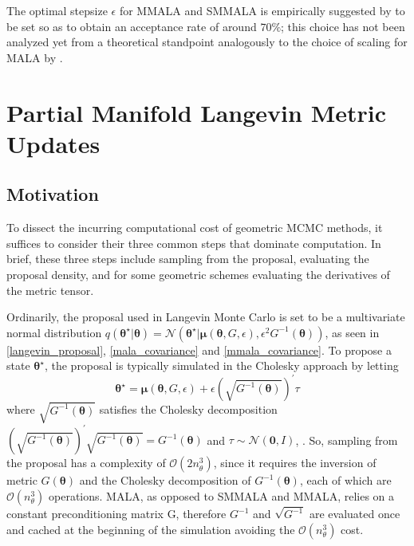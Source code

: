 \documentclass[twoside,11pt]{article}
\begin{document}
The optimal stepsize $\epsilon$ for MMALA and SMMALA is empirically suggested by \cite{gir_cal__rie} to be set so as to 
obtain an acceptance rate of around $70\%$; this choice has not been analyzed yet from a theoretical standpoint analogously 
to the choice of scaling for MALA by \cite{rob_ros__opt}.

\section{Partial Manifold Langevin Metric Updates}

\subsection{Motivation}
\label{Motivation}

To dissect the incurring computational cost of geometric MCMC methods, it suffices to consider their three common steps
that dominate computation. In brief, these three steps include sampling from the proposal, evaluating the proposal density,
and for some geometric schemes evaluating the derivatives of the metric tensor.

Ordinarily, the proposal used in Langevin Monte Carlo is set to be a multivariate normal distribution
$
q(\boldsymbol{\theta}^{\star}|\boldsymbol{\theta}) =
\mathcal{N}(\boldsymbol{\theta}^{\star}|
\boldsymbol{\mu}(\boldsymbol{\theta}, G, \epsilon), \epsilon^2 G^{-1}(\boldsymbol{\theta}))
$,
as seen in \eqref{langevin_proposal}, \eqref{mala_covariance} and \eqref{mmala_covariance}. To propose a state 
$\boldsymbol{\theta}^{\star}$, the proposal is typically simulated in the Cholesky approach by letting
\begin{equation}
\boldsymbol{\theta}^{\star} =
\boldsymbol{\mu}(\boldsymbol{\theta}, G, \epsilon)+
\epsilon \left(\sqrt{G^{-1}(\boldsymbol{\theta})}\right)^{'}\tau
\end{equation}
where $\sqrt{G^{-1}(\boldsymbol{\theta})}$ satisfies the Cholesky decomposition
$
\left(\sqrt{G^{-1}(\boldsymbol{\theta})}\right)^{'}\sqrt{G^{-1}(\boldsymbol{\theta})}=
G^{-1}(\boldsymbol{\theta})
$
and $\tau\sim\mathcal{N}(\mathbf{0}, I)$, \cite{chi_gre__und}.
So, sampling from the proposal has a complexity of $\mathcal{O}(2n_\theta^3)$, since it requires the inversion of metric 
$G(\boldsymbol{\theta})$ and the Cholesky decomposition of $G^{-1}(\boldsymbol{\theta})$, each of which are
$\mathcal{O}(n_\theta^3)$ operations. MALA, as opposed to SMMALA and MMALA, relies on a constant preconditioning matrix G,
therefore $G^{-1}$ and $\sqrt{G^{-1}}$ are evaluated once and cached at the beginning of the simulation avoiding the
$\mathcal{O}(n_\theta^3)$ cost.
\end{document}
